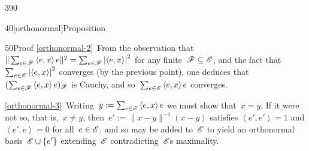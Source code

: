 \begin{parsec}{390}
\begin{point}{40}[orthonormal]{Proposition}
\begin{point}{50}{Proof}
\ref{orthonormal-2}\ 
From the observation
that~$\|\sum_{e\in\mathscr{F}} \left<e,x\right>e\|^2
= \sum_{e\in \mathscr{F}} \left|\left<e,x\right>\right|^2$
for any finite~$\mathscr{F}\subseteq \mathscr{E}$,
and the fact that~$\sum_{e\in \mathscr{E}} \left|\left<e,x\right>\right|^2$
converges (by the previous point),
one deduces that~$(\sum_{e\in\mathscr{F}} \left<e,x\right>e)_{\mathscr{F}}$
is Cauchy,
and so~$\sum_{e\in\mathscr{E}} \left<e,x\right>e$
converges.

\ref{orthonormal-3}\
Writing~$y:=\sum_{e\in\mathscr{E}} \left<e,x\right>e$ we must show that~$x=y$.
If it were not so,
that is,~$x\neq y$,
then~$e':=\|x-y\|^{-1}(x-y)$
satisfies
$\left<e',e'\right>=1$
and
$\left<e',e\right>=0$
for all~$e\in\mathscr{E}$,
and so may be added to~$\mathscr{E}$
to yield an orthonormal basis~$\mathscr{E}\cup\{e'\}$
extending~$\mathscr{E}$
contradicting~$\mathscr{E}$s  maximality.


\end{point}
\end{point}
\end{parsec}
